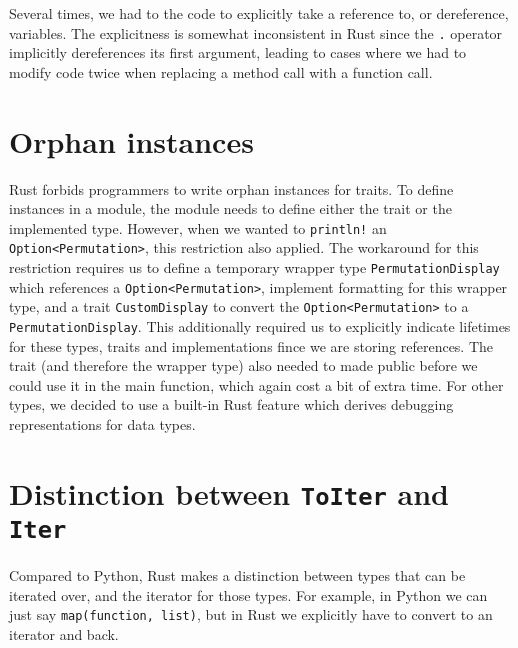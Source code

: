 \documentclass{article}
\begin{document}
Several times, we had to the code to explicitly take a reference to, or dereference, variables.
The explicitness is somewhat inconsistent in Rust since the \texttt{.} operator implicitly dereferences its first argument, leading to cases where we had to modify code twice when replacing a method call with a function call.

\section{Orphan instances}

Rust forbids programmers to write orphan instances for traits. To define instances in a module, the module needs to define either the trait or the implemented type. However, when we wanted to \texttt{println!} an \texttt{Option<Permutation>}, this restriction also applied. 
The workaround for this restriction requires us to define a temporary wrapper type \texttt{PermutationDisplay} which references a \texttt{Option<Permutation>}, implement formatting for this wrapper type, and a trait \texttt{CustomDisplay} to convert the \texttt{Option<Permutation>} to a \texttt{PermutationDisplay}.
This additionally required us to explicitly indicate lifetimes for these types, traits and implementations fince we are storing references.
The trait (and therefore the wrapper type) also needed to made public before we could use it in the main function, which again cost a bit of extra time.
For other types, we decided to use a built-in Rust feature which derives debugging representations for data types.

\section{Distinction between \texttt{ToIter} and \texttt{Iter}}

Compared to Python, Rust makes a distinction between types that can be iterated over, and the iterator for those types. For example, in Python we can just say \texttt{map(function, list)}, but in Rust we explicitly have to convert to an iterator and back.
\end{document}
